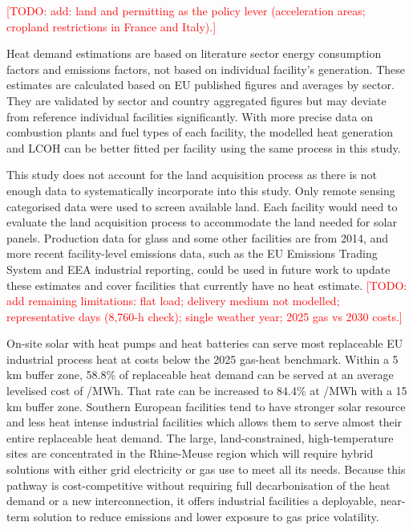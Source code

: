 \documentclass[11pt]{article}
\newcommand{\todo}[1]{\textcolor{red}{[TODO: #1]}}
\begin{document}
\todo{add: land and permitting as the policy lever (acceleration areas; cropland restrictions in France and Italy).}

Heat demand estimations are based on literature sector energy consumption factors and emissions factors, not based on individual facility's generation. These estimates are calculated based on EU published figures and averages by sector. They are validated by sector and country aggregated figures but may deviate from reference individual facilities significantly. With more precise data on combustion plants and fuel types of each facility, the modelled heat generation and LCOH can be better fitted per facility using the same process in this study.

This study does not account for the land acquisition process as there is not enough data to systematically incorporate into this study. Only remote sensing categorised data were used to screen available land. Each facility would need to evaluate the land acquisition process to accommodate the land needed for solar panels.
Production data for glass and some other facilities are from 2014, and more recent facility-level emissions data, such as the EU Emissions Trading System and EEA industrial reporting, could be used in future work to update these estimates and cover facilities that currently have no heat estimate.
\todo{add remaining limitations: flat load; delivery medium not modelled; representative days (8,760-h check); single weather year; 2025 gas vs 2030 costs.}

On-site solar with heat pumps and heat batteries can serve most replaceable EU industrial process heat at costs below the 2025 gas-heat benchmark. Within a 5\,km buffer zone, 58.8\% of replaceable heat demand can be served at an average levelised cost of /MWh. That rate can be increased to 84.4\% at /MWh with a 15\,km buffer zone. Southern European facilities tend to have stronger solar resource and less heat intense industrial facilities which allows them to serve almost their entire replaceable heat demand. The large, land-constrained, high-temperature sites are concentrated in the Rhine-Meuse region which will require hybrid solutions with either grid electricity or gas use to meet all its needs. Because this pathway is cost-competitive without requiring full decarbonisation of the heat demand or a new interconnection, it offers industrial facilities a deployable, near-term solution to reduce emissions and lower exposure to gas price volatility.
\end{document}
